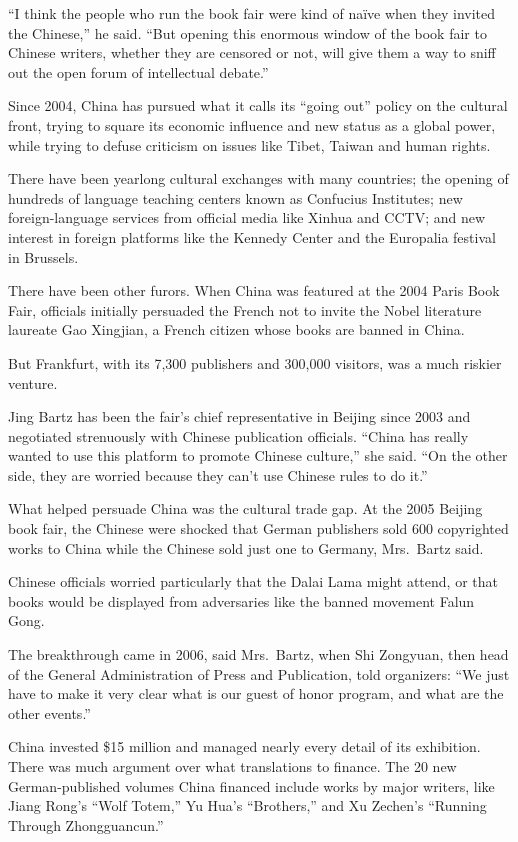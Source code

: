 ﻿\documentclass[12pt]{article}
\begin{document}
``I think the people who run the book fair were kind of na\"ive when they invited the Chinese,'' he
said. ``But opening this enormous window of the book fair to Chinese writers, whether they are
censored or not, will give them a way to sniff out the open forum of intellectual debate.''

Since 2004, China has pursued what it calls its ``going out'' policy on the cultural front, trying
to square its economic influence and new status as a global power, while trying to defuse criticism
on issues like Tibet, Taiwan and human rights.

There have been yearlong cultural exchanges with many countries; the opening of hundreds of language
teaching centers known as Confucius Institutes; new foreign-language services from official media
like Xinhua and CCTV; and new interest in foreign platforms like the Kennedy Center and the
Europalia festival in Brussels.

There have been other furors. When China was featured at the 2004 Paris Book Fair, officials
initially persuaded the French not to invite the Nobel literature laureate Gao Xingjian, a French
citizen whose books are banned in China.

But Frankfurt, with its 7,300 publishers and 300,000 visitors, was a much riskier venture.

Jing Bartz has been the fair's chief representative in Beijing since 2003 and negotiated strenuously
with Chinese publication officials. ``China has really wanted to use this platform to promote
Chinese culture,'' she said. ``On the other side, they are worried because they can't use Chinese
rules to do it.''

What helped persuade China was the cultural trade gap. At the 2005 Beijing book fair, the Chinese
were shocked that German publishers sold 600 copyrighted works to China while the Chinese sold just
one to Germany, Mrs.~Bartz said.

Chinese officials worried particularly that the Dalai Lama might attend, or that books would be
displayed from adversaries like the banned movement Falun Gong.

The breakthrough came in 2006, said Mrs.~Bartz, when Shi Zongyuan, then head of the General
Administration of Press and Publication, told organizers: ``We just have to make it very clear what
is our guest of honor program, and what are the other events.''

China invested \$15 million and managed nearly every detail of its exhibition. There was much
argument over what translations to finance. The 20 new German-published volumes China financed
include works by major writers, like Jiang Rong's ``Wolf Totem,'' Yu Hua's ``Brothers,'' and Xu
Zechen's ``Running Through Zhongguancun.''
\end{document}

